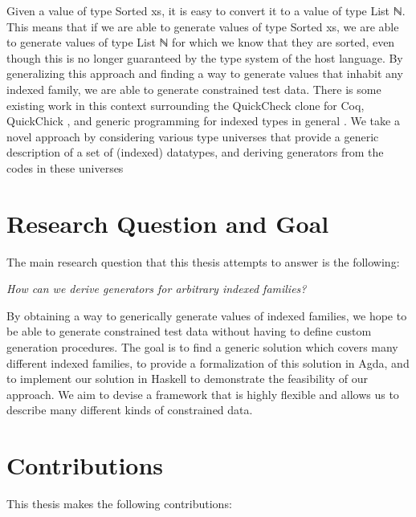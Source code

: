 \documentclass[a4paper,msc,twosized=semi]{uustthesis}
\let\oldemph\emph
\renewcommand\emph[1]{{\large\oldemph{#1}}}
\newcommand{\agda}[1]{{\agdafontinline\color{agdacolor}#1}}
\newcommand{\includeagda}[2]{\vspace*{-0.25cm}\begin{center}{\fontsize{12}{14}\agdafont\ExecuteMetaData[../src/chap0#1/latex/code.tex]{#2}}\end{center}\vspace*{-0.25cm}}
\begin{document}
\includeagda{2}{sorted}

  Given a value of type \agda{Sorted xs}, it is easy to convert it to a value of type \agda{List 
  ℕ}. This means that if we are able to generate values of type \agda{Sorted xs}, we are 
  able to generate values of type \agda{List ℕ} for which we know that they are sorted, 
  even though this is no longer guaranteed by the type system of the host language. By 
  generalizing this approach and finding a way to generate values that inhabit any 
  indexed family, we are able to generate constrained test data. There is some 
  existing work in this context surrounding the QuickCheck clone for Coq, QuickChick 
  \cite{denes2014quickchick}, and generic programming for indexed types in general \cite{magalhaes2011generic}. 
  We take a novel approach by considering various type universes that provide a 
  generic description of a set of (indexed) datatypes, and deriving generators from 
  the codes in these universes

\section{Research Question and Goal}

  The main research question that this thesis attempts to answer is the following: 
  \begin{center}
  \emph{
    How can we derive generators for arbitrary indexed families?
  } \end{center}
  By obtaining a way to generically generate values of indexed families, we hope to be 
  able to generate constrained test data without having to define custom generation 
  procedures. The goal is to find a generic solution which covers many different 
  indexed families, to provide a formalization of this solution in Agda, and to 
  implement our solution in Haskell to demonstrate the feasibility of our approach. We 
  aim to devise a framework that is highly flexible and allows us to describe many 
  different kinds of constrained data. 

\section{Contributions}

  This thesis makes the following contributions: 
\end{document}
